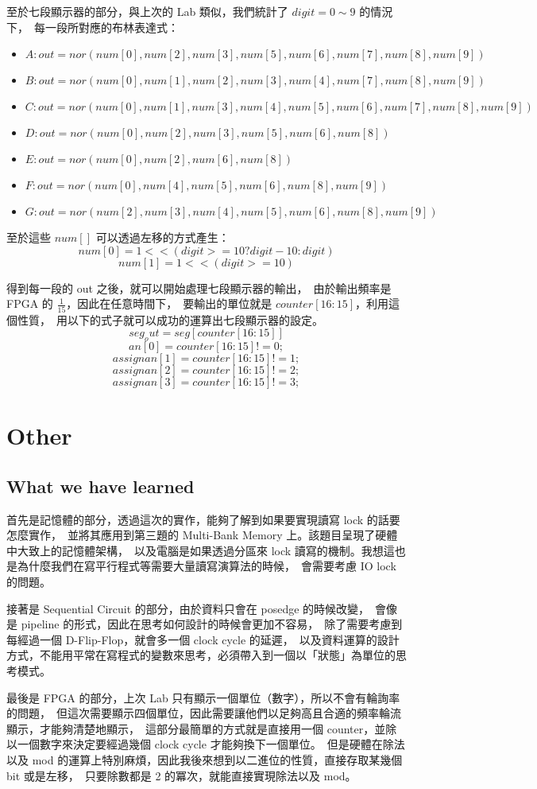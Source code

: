 \documentclass[10.5pt,compsoc,UTF8]{CjC}
\theoremstyle{mystyle}
\begin{document}
至於七段顯示器的部分，與上次的 Lab 類似，我們統計了 $digit = 0 \sim 9$ 的情況下，\
每一段所對應的布林表達式：
\begin{itemize}
  \item $A: out = nor(num[0], num[2], num[3],
  num[5], num[6], num[7], num[8], num[9])$
  \item $B: out = nor(num[0], num[1], num[2], num[3], num[4],
  num[7], num[8], num[9])$
  \item $C: out = nor(num[0], num[1], num[3], num[4],
  num[5], num[6], num[7], num[8], num[9])$
  \item $D: out = nor(num[0], num[2], num[3], 
  num[5], num[6], num[8])$
  \item $E: out = nor(num[0], num[2],
  num[6], num[8])$
  \item $F: out = nor(num[0], num[4],
        num[5], num[6], num[8], num[9])$
  \item $G: out = nor(num[2], num[3], num[4],
        num[5], num[6], num[8], num[9])$
\end{itemize}
\par

至於這些 $num[]$ 可以透過左移的方式產生：
$$num[0] = 1 << (digit >= 10 ? digit - 10 : digit)$$
$$num[1] = 1 << (digit >= 10)$$

得到每一段的 out 之後，就可以開始處理七段顯示器的輸出，\
由於輸出頻率是 FPGA 的 $\frac{1}{15}$，因此在任意時間下，\
要輸出的單位就是 $counter[16:15]$，利用這個性質，\
用以下的式子就可以成功的運算出七段顯示器的設定。
$$seg_out = seg[counter[16:15]]$$
$$an[0] = counter[16:15] != 0;$$
$$assign an[1] = counter[16:15] != 1;$$
$$assign an[2] = counter[16:15] != 2;$$
$$assign an[3] = counter[16:15] != 3;$$

\section{Other}
\subsection*{What we have learned}
首先是記憶體的部分，透過這次的實作，能夠了解到如果要實現讀寫 lock 的話要怎麼實作，\
並將其應用到第三題的 Multi-Bank Memory 上。該題目呈現了硬體中大致上的記憶體架構，\
以及電腦是如果透過分區來 lock 讀寫的機制。我想這也是為什麼我們在寫平行程式等需要大量讀寫演算法的時候，\
會需要考慮 IO lock 的問題。
\par
接著是 Sequential Circuit 的部分，由於資料只會在 posedge 的時候改變，\
會像是 pipeline 的形式，因此在思考如何設計的時候會更加不容易，\
除了需要考慮到每經過一個 D-Flip-Flop，就會多一個 clock cycle 的延遲，\
以及資料運算的設計方式，不能用平常在寫程式的變數來思考，必須帶入到一個以「狀態」為單位的思考模式。
\par
最後是 FPGA 的部分，上次 Lab 只有顯示一個單位（數字），所以不會有輪詢率的問題，\
但這次需要顯示四個單位，因此需要讓他們以足夠高且合適的頻率輪流顯示，才能夠清楚地顯示，\
這部分最簡單的方式就是直接用一個 counter，並除以一個數字來決定要經過幾個 clock cycle 才能夠換下一個單位。\
但是硬體在除法以及 mod 的運算上特別麻煩，因此我後來想到以二進位的性質，直接存取某幾個 bit 或是左移，\
只要除數都是 2 的冪次，就能直接實現除法以及 mod。
\end{document}
